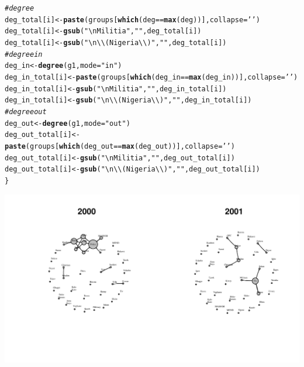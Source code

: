 \documentclass[12pt, letterpaper, notitlepage, onecolumn, twoside, openbib]{article}\usepackage[]{graphicx}\usepackage[]{color}
\makeatletter
\newcommand{\hlstr}[1]{\textcolor[rgb]{0.192,0.494,0.8}{#1}}%
\newcommand{\hlcom}[1]{\textcolor[rgb]{0.678,0.584,0.686}{\textit{#1}}}%
\newcommand{\hlopt}[1]{\textcolor[rgb]{0,0,0}{#1}}%
\newcommand{\hlstd}[1]{\textcolor[rgb]{0.345,0.345,0.345}{#1}}%
\newcommand{\hlkwb}[1]{\textcolor[rgb]{0.69,0.353,0.396}{#1}}%
\newcommand{\hlkwc}[1]{\textcolor[rgb]{0.333,0.667,0.333}{#1}}%
\newcommand{\hlkwd}[1]{\textcolor[rgb]{0.737,0.353,0.396}{\textbf{#1}}}%
\newenvironment{kframe}{%
 \def\at@end@of@kframe{}%
 \ifinner\ifhmode%
  \def\at@end@of@kframe{\end{minipage}}%
  \begin{minipage}{\columnwidth}%
 \fi\fi%
 \def\FrameCommand##1{\hskip\@totalleftmargin \hskip-\fboxsep
 \colorbox{shadecolor}{##1}\hskip-\fboxsep
     \hskip-\linewidth \hskip-\@totalleftmargin \hskip\columnwidth}%
 \MakeFramed {\advance\hsize-\width
   \@totalleftmargin\z@ \linewidth\hsize
   \@setminipage}}%
 {\par\unskip\endMakeFramed%
 \at@end@of@kframe}
\newenvironment{knitrout}{}{} %
\makeatother
\begin{document}
\begin{knitrout}
\begin{kframe}
\begin{alltt}
  \hlcom{#degree}
  \hlstd{deg_total[i]} \hlkwb{<-} \hlkwd{paste}\hlstd{(groups[}\hlkwd{which}\hlstd{( deg} \hlopt{==} \hlkwd{max}\hlstd{(deg) )],} \hlkwc{collapse} \hlstd{=} \hlstr{' '}\hlstd{)}
  \hlstd{deg_total[i]} \hlkwb{<-} \hlkwd{gsub}\hlstd{(}\hlstr{"\textbackslash{}nMilitia"}\hlstd{,} \hlstr{""}\hlstd{, deg_total[i])}
  \hlstd{deg_total[i]} \hlkwb{<-} \hlkwd{gsub}\hlstd{(}\hlstr{"\textbackslash{}n\textbackslash{}\textbackslash{}(Nigeria\textbackslash{}\textbackslash{})"}\hlstd{,} \hlstr{""}\hlstd{, deg_total[i])}
  \hlcom{#degree in }
  \hlstd{deg_in} \hlkwb{<-} \hlkwd{degree}\hlstd{(g1,} \hlkwc{mode}\hlstd{=}\hlstr{"in"}\hlstd{)}
  \hlstd{deg_in_total[i]} \hlkwb{<-} \hlkwd{paste}\hlstd{(groups[}\hlkwd{which}\hlstd{( deg_in} \hlopt{==} \hlkwd{max}\hlstd{(deg_in) )],} \hlkwc{collapse} \hlstd{=} \hlstr{' '}\hlstd{)}
  \hlstd{deg_in_total[i]} \hlkwb{<-} \hlkwd{gsub}\hlstd{(}\hlstr{"\textbackslash{}nMilitia"}\hlstd{,} \hlstr{""}\hlstd{, deg_in_total[i])}
  \hlstd{deg_in_total[i]} \hlkwb{<-} \hlkwd{gsub}\hlstd{(}\hlstr{"\textbackslash{}n\textbackslash{}\textbackslash{}(Nigeria\textbackslash{}\textbackslash{})"}\hlstd{,} \hlstr{""}\hlstd{, deg_in_total[i])}
  \hlcom{#degree out}
  \hlstd{deg_out} \hlkwb{<-} \hlkwd{degree}\hlstd{(g1,} \hlkwc{mode}\hlstd{=}\hlstr{"out"}\hlstd{)}
  \hlstd{deg_out_total[i]} \hlkwb{<-} \hlkwd{paste}\hlstd{(groups[}\hlkwd{which}\hlstd{( deg_out} \hlopt{==} \hlkwd{max}\hlstd{(deg_out) )],} \hlkwc{collapse} \hlstd{=} \hlstr{' '}\hlstd{)}
  \hlstd{deg_out_total[i]} \hlkwb{<-} \hlkwd{gsub}\hlstd{(}\hlstr{"\textbackslash{}nMilitia"}\hlstd{,} \hlstr{""}\hlstd{, deg_out_total[i])}
  \hlstd{deg_out_total[i]} \hlkwb{<-} \hlkwd{gsub}\hlstd{(}\hlstr{"\textbackslash{}n\textbackslash{}\textbackslash{}(Nigeria\textbackslash{}\textbackslash{})"}\hlstd{,} \hlstr{""}\hlstd{, deg_out_total[i])}
\hlstd{\}}
\end{alltt}
\end{kframe}
\includegraphics[width=1.1\linewidth]{figure/unnamed-chunk-4-1} 


\end{knitrout}
\end{document}
